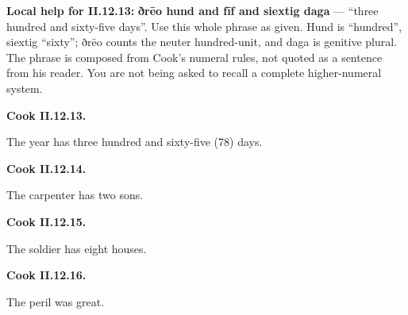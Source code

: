 \textbf{Local help for II.12.13:} \textbf{ðrēo hund and fīf and siextig daga} — “three hundred and sixty-five days”. Use this whole phrase as given. Hund is “hundred”, siextig “sixty”; ðrēo counts the neuter hundred-unit, and daga is genitive plural. The phrase is composed from Cook’s numeral rules, not quoted as a sentence from his reader. You are not being asked to recall a complete higher-numeral system.

\par\begin{minipage}{\linewidth}\raggedright
\textbf{Cook II.12.13.}

The year has three hundred and sixty-five (78) days.

\end{minipage}\par\addvspace{4pt}

\par\begin{minipage}{\linewidth}\raggedright
\textbf{Cook II.12.14.}

The carpenter has two sons.

\end{minipage}\par\addvspace{4pt}

\par\begin{minipage}{\linewidth}\raggedright
\textbf{Cook II.12.15.}

The soldier has eight houses.

\end{minipage}\par\addvspace{4pt}

\par\begin{minipage}{\linewidth}\raggedright
\textbf{Cook II.12.16.}

The peril was great.

\end{minipage}\par\addvspace{4pt}

